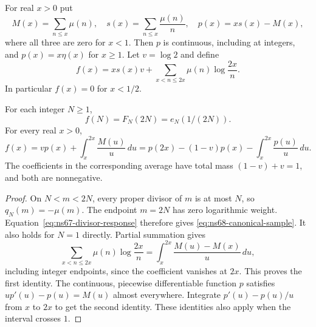 For real $x>0$ put
\[
 M(x)=\sum_{n\leq x}\mu(n),\quad s(x)=\sum_{n\leq x}\frac{\mu(n)}n,
 \quad p(x)=x s(x)-M(x),
\]
where all three are zero for $x<1$. Then $p$ is continuous, including
at integers, and $p(x)=x\eta(x)$ for $x\geq1$.
Let $v=\log2$ and define
\begin{equation}
 f(x)=x s(x)v+\sum_{x<n\leq2x}\mu(n)\log\frac{2x}{n}.
 \label{eq:ns68-forcing}
\end{equation}
In particular $f(x)=0$ for $x<1/2$.

\begin{proposition}
\label{prop:ns68-renewal}
For each integer $N\geq1$,
\begin{equation}
 f(N)=F_N(2N)=e_N(1/(2N)).
 \label{eq:ns68-canonical-sample}
\end{equation}
For every real $x>0$,
\begin{equation}
 f(x)=v p(x)+\int_x^{2x}\frac{M(u)}u\,du
     =p(2x)-(1-v)p(x)-\int_x^{2x}\frac{p(u)}u\,du.
 \label{eq:ns68-renewal-identity}
\end{equation}
The coefficients in the corresponding average have total mass
$(1-v)+v=1$, and both are nonnegative.
\end{proposition}
\begin{proof}
On $N<m<2N$, every proper divisor of $m$ is at most $N$, so
$q_N(m)=-\mu(m)$. The endpoint $m=2N$ has zero logarithmic weight.
Equation~\eqref{eq:ns67-divisor-response} therefore gives
\eqref{eq:ns68-canonical-sample}. It also holds for $N=1$ directly.
Partial summation gives
\[
 \sum_{x<n\leq2x}\mu(n)\log\frac{2x}{n}
       =\int_x^{2x}\frac{M(u)-M(x)}u\,du,
\]
including integer endpoints, since the coefficient vanishes at $2x$.
This proves the first identity. The continuous, piecewise differentiable
function $p$ satisfies $u p'(u)-p(u)=M(u)$ almost everywhere. Integrate
$p'(u)-p(u)/u$ from $x$ to $2x$ to get the second identity. These
identities also apply when the interval crosses $1$.
\end{proof}

